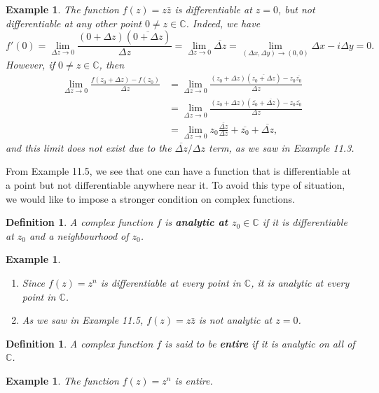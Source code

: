 \documentclass[10pt]{article}
\newcommand{\C}{\mathbb{C}}
\theoremstyle{newstyle}
\newtheorem{defn}[thm]{Definition}
\newtheorem{exmp}[thm]{Example}
\begin{document}
\begin{exmp}
The function $f(z) = z\bar{z}$ is differentiable at $z=0$, but not differentiable at any other point
$0 \neq z \in \C$. Indeed, we have 
\[ f'(0) = \lim_{\Delta z \to 0} \frac{(0+\Delta z)(\overline{0 + \Delta z})}{\Delta z} 
= \lim_{\Delta z \to 0} \overline{\Delta z} = \lim_{(\Delta x, \Delta y) \to (0, 0)} 
\Delta x - i\Delta y = 0. \]
However, if $0 \neq z \in \C$, then 
\begin{align*}
    \lim_{\Delta z \to 0} \frac{f(z_0 + \Delta z) - f(z_0)}{\Delta z}
    &= \lim_{\Delta z \to 0} \frac{(z_0 + \Delta z)(\overline{z_0 + \Delta z}) - z_0\overline{z_0}}{\Delta z} \\
    &= \lim_{\Delta z \to 0} \frac{(z_0 + \Delta z)(\overline{z_0} + \overline{\Delta z}) - z_0\overline{z_0}}{\Delta z} \\
    &= \lim_{\Delta z \to 0} z_0 \frac{\overline{\Delta z}}{\Delta z} + \overline{z_0} + \overline{\Delta z}, 
\end{align*}
and this limit does not exist due to the $\overline{\Delta z}/\Delta z$ term, as we saw in Example 11.3.
\end{exmp}

From Example 11.5, we see that one can have a function that is differentiable at a point but not 
differentiable anywhere near it. To avoid this type of situation, we would like to impose a stronger 
condition on complex functions. 

\begin{defn}
A complex function $f$ is {\bf analytic at $z_0 \in \C$} if it is differentiable at $z_0$ 
and a neighbourhood of $z_0$. 
\end{defn}

\begin{exmp}~
\begin{enumerate}[(1)]
    \item Since $f(z) = z^n$ is differentiable at every point in $\C$, it is analytic at every 
    point in $\C$. 
    \item As we saw in Example 11.5, $f(z) = z\bar{z}$ is not analytic at $z = 0$. 
\end{enumerate}
\end{exmp}

\begin{defn}
A complex function $f$ is said to be {\bf entire} if it is analytic on all of $\C$.
\end{defn}

\begin{exmp}
The function $f(z) = z^n$ is entire.
\end{exmp}
\end{document}
